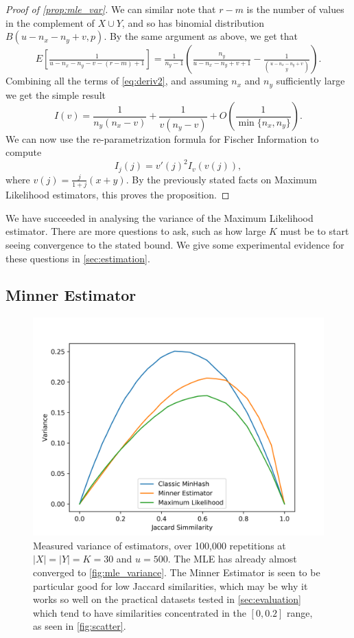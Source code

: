 \begin{proof}[Proof of \cref{prop:mle_var}]
   We can similar note that $r-m$ is the number of values in the complement of $X\cup Y$, and so has binomial distribution $B(u-n_x-n_y+v, p)$.
   By the same argument as above, we get that
   \[
      E\left[\tfrac1{u-n_x-n_y-v-(r-m)+1}\right]
      = \tfrac1{n_y-1}\left(\tfrac{n_y}{u-n_x-n_y+v+1} - \tfrac1{\binom{u-n_x-n_y+v}{y}}\right).
   \]
   Combining all the terms of \cref{eq:deriv2}, and assuming $n_x$ and $n_y$ sufficiently large we get the simple result
   \[
   I(v)
   = \frac{1}{n_y(n_x-v)} + \frac1{v(n_y-v)} + O\left( \frac{1}{\min\{n_x,n_y\}} \right).
   \]
   We can now use the re-parametrization formula for Fischer Information to compute
   \[
      I_j(j) = v'(j)^{2}I_v(v(j)),
   \]
   where $v(j) = \frac{j}{1+j}(x+y)$.
   By the previously stated facts on Maximum Likelihood estimators, this proves the proposition.
\end{proof}

We have succeeded in analysing the variance of the Maximum Likelihood estimator.
There are more questions to ask, such as how large $K$ must be to start seeing convergence to the stated bound.
We give some experimental evidence for these questions in \cref{sec:estimation}.

\subsection{Minner Estimator}

\begin{figure}
   \includegraphics[trim=10 0 45 40,clip,width=\linewidth]{figures/synvar_100000.png}
   \caption{Measured variance of estimators, over 100,000 repetitions at $|X|=|Y|=K=30$ and $u=500$.
      The MLE has already almost converged to \cref{fig:mle_variance}.
      The Minner Estimator is seen to be particular good for low Jaccard similarities, which may be why it works so well on the practical datasets tested in \cref{sec:evaluation} which tend to have similarities concentrated in the $[0,0.2]$ range, as seen in \cref{fig:scatter}.}
   \label{fig:exp_variance}
\end{figure}


